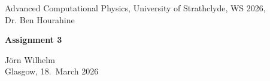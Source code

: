 \documentclass[english, 10pt,a4paper,oneside,headinclude,footinclude,BCOR5mm]{scrartcl}
\begin{document}
\renewcommand{\sectionmark}[1]{\markright{\spacedlowsmallcaps{#1}}} 
\lehead{\mbox{\llap{\small\thepage\kern1em\color{halfgray} \vline}\color{halfgray}\hspace{0.5em}\rightmark\hfil}} 
\pagestyle{plain} 


\begin{center}
    \large Advanced Computational Physics, University of Strathclyde, WS 2026,\\ Dr. Ben Hourahine

    \vspace{0.5cm}

    {\LARGE\bfseries Assignment 3\par}

    \vspace{0.5cm}

    \large Jörn Wilhelm\\
    Glasgow, 18.\ March 2026

    \vspace{1cm}
\end{center}

\newcommand{\cancelblue}[2]{
  \textcolor{blue}{\cancelto{#1}{\textcolor{black}{#2}}}
}
\newcommand{\overblue}[2]{
  \textcolor{blue}{\overbrace{\textcolor{black}{#2}}^{#1}}
}
\newcommand{\underblue}[2]{
  \textcolor{blue}{\underbrace{\textcolor{black}{#2}}_{#1}}
}
\newcommand{\blue}[1]{\textcolor{blue}{#1}}
\newcommand{\red}[1]{\textcolor{red}{#1}}
\end{document}

